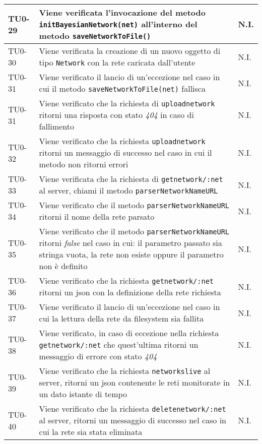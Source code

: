 \begin{longtable}{|C{.15\textwidth}|m{.65\textwidth}|C{.20\textwidth}|}
\hline 
{}TU0-29 & Viene verificata l'invocazione del metodo \texttt{initBayesianNetwork(net)} all'interno del metodo \texttt{saveNetworkToFile()} & N.I. \\ 
\hline 
TU0-30 & Viene verificata la creazione di un nuovo oggetto di tipo \texttt{Network} con la rete caricata dall'utente & N.I. \\ 
\hline
{} TU0-31 & Viene verificato il lancio di un'eccezione nel caso in cui il metodo \texttt{saveNetworkToFile(net)} fallisca & N.I. \\
\hline
TU0-31 & Viene verificato che la richiesta di \texttt{uploadnetwork} ritorni una risposta con stato \textit{404} in caso di fallimento & N.I. \\ 
\hline
{} TU0-32 & Viene verificato che la richiesta \texttt{uploadnetwork} ritorni un messaggio di successo nel caso in cui il metodo non ritorni errori & N.I. \\
\hline
TU0-33 & Viene verificata che la richiesta di \texttt{getnetwork/:net} al server, chiami il metodo \texttt{parserNetworkNameURL} & N.I. \\ 
\hline
{} TU0-34 & Viene verificato che il metodo \texttt{parserNetworkNameURL} ritorni il nome della rete parsato & N.I. \\ 
\hline 
TU0-35 & Viene verificato che il metodo \texttt{parserNetworkNameURL} ritorni \textit{false} nel caso in cui: il parametro passato sia stringa vuota, la rete non esiste oppure il parametro non è definito & N.I. \\ 
\hline 
{}TU0-36 & Viene verificato che la richiesta \texttt{getnetwork/:net} ritorni un json con la definizione della rete richiesta & N.I. \\ 
\hline 
TU0-37 & Viene verificato il lancio di un'eccezione nel caso in cui la lettura della rete da filesystem sia fallita & N.I. \\
\hline
  TU0-38 & Viene verificato, in caso di eccezione nella richiesta \texttt{getnetwork/:net} che quest'ultima ritorni un messaggio di errore con stato \textit{404} & N.I. \\ 
 \hline
 TU0-39 & Viene verificato che la richiesta \texttt{networkslive} al server, ritorni un json contenente le reti monitorate in un dato istante di tempo & N.I. \\ 
 \hline 
 TU0-40 & Viene verificato che la richiesta \texttt{deletenetwork/:net} al server, ritorni un messaggio di successo nel caso in cui la rete sia stata eliminata & N.I. \\

\end{longtable}
